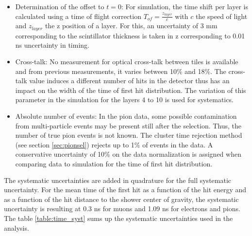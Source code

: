 \begin{itemize}
	\item Determination of the offset to $t=0$: For simulation, the time shift per layer is calculated using a time of flight correction $T_{of} = \frac{z_{layer}}{c}$ with $c$ the speed of light and $z_{layer}$ the z position of a layer. For this, an uncertainty of 3 mm corresponding to the scintillator thickness is taken in z corresponding to 0.01 ns uncertainty in timing.
	\item Cross-talk: No measurement for optical cross-talk between tiles is available and from previous measurements, it varies between 10\% and 18\%. The cross-talk value induces a different number of hits in the detector thus has an impact on the width of the time of first hit distribution. The variation of this parameter in the simulation for the layers 4 to 10 is used for systematics.
	\item Absolute number of events: In the pion data, some possible contamination from multi-particle events may be present still after the selection. Thus, the number of true pion events is not known. The cluster time rejection method (see section \ref{sec:pionsel}) rejects up to 1\% of events in the data. A conservative uncertainty of 10\% on the data normalization is assigned when comparing data to simulation for the time of first hit distribution.
\end{itemize}

The systematic uncertainties are added in quadrature for the full systematic uncertainty. For the mean time of the first hit as a function of the hit energy and as a function of the hit distance to the shower center of gravity, the systematic uncertainty is resulting at 0.3 ns for muons and 1.09 ns for electrons and pions. The table \ref{table:time_syst} sums up the systematic uncertainties used in the analysis.

